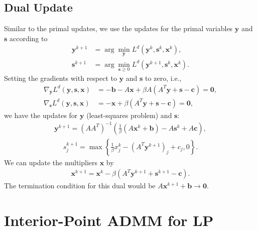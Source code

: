 \documentclass{article}
\begin{document}
\subsection*{Dual Update}
Similar to the primal updates, we use the updates for the primal variables $\mathbf{y}$ and $\mathbf{s}$ according to 
\begin{align}
\mathbf{y}^{k+1} & = \arg \min_{\mathbf{y}} L^{d}(\mathbf{y}^{k},\mathbf{s}^k, \mathbf{x}^{k}),\\
\mathbf{s}^{k+1} & = \arg \min_{\mathbf{s} \geq 0} L^{d}(\mathbf{y}^{k+1},\mathbf{s}^k,\mathbf{x}^{k}).
\end{align}
Setting the gradients with respect to $\mathbf{y}$ and $\mathbf{s}$ to zero, i.e.,
\begin{align}
\nabla_{\mathbf{y}}L^{d}(\mathbf{y},\mathbf{s},\mathbf{x}) & =  -\mathbf{b}-A\mathbf{x}+\beta A\left(A^{T}\mathbf{y}+\mathbf{s}-\mathbf{c}\right)  = \mathbf{0}, \\
\nabla_{\mathbf{s}}L^{d}(\mathbf{y},\mathbf{s},\mathbf{x}) & =  -\mathbf{x}+\beta\left(A^{T}\mathbf{y}+\mathbf{s}-\mathbf{c}\right) =  \mathbf{0},
\end{align}
we have the updates for $\mathbf{y}$ (least-squares problem) and $\mathbf{s}$:
\begin{align}\label{eq:y_dual_update}
\mathbf{y}^{k+1} = \left(AA^{T}\right)^{-1}\left(\frac{1}{\beta}\left(A\mathbf{x}^{k}+\mathbf{b}\right)-A\mathbf{s}^{k}+A\mathbf{c}\right),
\end{align}
\begin{align}\label{eq:s_dual_update}
s_j^{k+1} = \max\left\{ \frac{1}{\beta}{x}_j^k-(A^{T}\mathbf{y}^{k+1})_j+{c}_j,0\right\}.
\end{align}
We can update the multipliers $\mathbf{x}$ by
\begin{align}\label{eq:x_dual_update}
\mathbf{x}^{k+1} = \mathbf{x}^k - \beta\left(A^T \mathbf{y}^{k+1} + \mathbf{s}^{k+1} - \mathbf{c}\right).
\end{align}
The termination condition for this dual would be $A \mathbf{x}^{k+1} + \mathbf{b} \to \mathbf{0}$.


\vspace{0.5in}
\section{Interior-Point ADMM for LP}

\vspace{0.1in}
\end{document}
